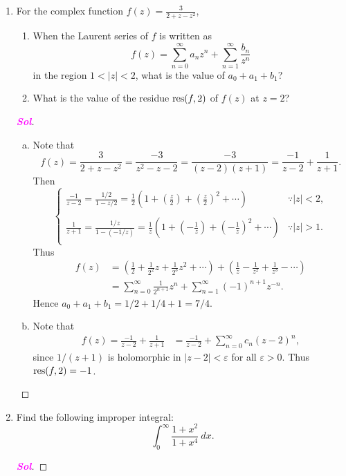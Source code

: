 \documentclass{article}
\theoremstyle{definition}
\newcommand{\of}[1]{\left( #1 \right)}
\newcommand{\abs}[1]{\left\lvert #1 \right\rvert}
\newcommand{\sol}{\textcolor{magenta}{\bf Sol}}
\newcommand{\res}{\textnormal{res}}
\begin{document}
\begin{enumerate}[\bf 1.]
\begin{proof}[\sol]
		\end{proof}
		\newpage
		\item For the complex function $f(z)=\displaystyle\frac{3}{2+z-z^2}$,
		\begin{enumerate}
			\item When the Laurent series of $f$ is written as \[
			f(z)=\sum_{n=0}^{\infty}a_nz^n+\sum_{n=1}^\infty\frac{b_n}{z^n}
			\] in the region $1<\abs{z}<2$, what is the value of $a_0+a_1+b_1$?
			\vspace{4pt}
			\item What is the value of the residue $\res(f,2)$ of $f(z)$ at $z=2$?
		\end{enumerate}
		\begin{proof}[\sol]
			\begin{enumerate}[(a)]
				\item Note that \[
				f(z)=\frac{3}{2+z-z^2}=\frac{-3}{z^2-z-2}=\frac{-3}{(z-2)(z+1)}=\frac{-1}{z-2}+\frac{1}{z+1}.
				\] Then \[
				\begin{cases}
				\displaystyle\frac{-1}{z-2}=\frac{1/2}{1-z/2}=\frac{1}{2}\of{1+\of{\frac{z}{2}}+\of{\frac{z}{2}}^2+\cdots} &\because\abs{z}<2,\\
				\\
				\displaystyle\frac{1}{z+1}=\frac{1/z}{1-(-1/z)}=\frac{1}{z}\of{1+\of{-\frac{1}{z}}+\of{-\frac{1}{z}}^2+\cdots} &\because\abs{z}>1.\\
				\end{cases}
				\] Thus \begin{align*}
				f(z)&=\of{\frac{1}{2}+\frac{1}{2^2}z+\frac{1}{2^3}z^2+\cdots}+\of{\frac{1}{z}-\frac{1}{z^2}+\frac{1}{z^3}-\cdots}\\
				&=\sum_{n=0}^\infty\frac{1}{2^{n+1}}z^n+\sum_{n=1}^\infty(-1)^{n+1}z^{-n}.
				\end{align*} Hence $a_0+a_1+b_1=1/2+1/4+1=7/4$.
				\vspace{4pt}
				\item Note that \begin{align*}
				f(z)=\frac{-1}{z-2}+\frac{1}{z+1}&=\frac{-1}{z-2}+\sum_{n=0}^{\infty}c_n(z-2)^n,
				\end{align*} since $1/(z+1)$ is holomorphic in $\abs{z-2}<\varepsilon$ for all $\varepsilon>0$. Thus $\res(f,2)=-1$.
			\end{enumerate}
		\end{proof}
		\newpage
		\item Find the following improper integral: \[
		\int_0^{\infty}\frac{1+x^2}{1+x^4}\ dx.
		\]
		\begin{proof}[\sol]

\end{proof}
\end{enumerate}
\end{document}
